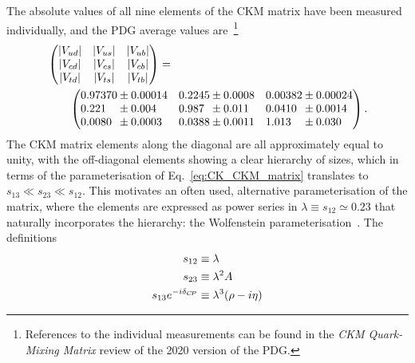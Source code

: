 The absolute values of all nine elements of the CKM matrix have been measured individually, and the PDG average values are~\cite{PDG2020}\footnote{References to the individual measurements can be found in the \emph{CKM Quark-Mixing Matrix} review of the 2020 version of the PDG.}
\begin{align}
    &\begin{pmatrix}
        |V_{ud}| & 
        |V_{us}| & 
        |V_{ub}| \\
        |V_{cd}| & 
        |V_{cs}| & 
        |V_{cb}| \\
        |V_{td}| & 
        |V_{ts}| & 
        |V_{tb}| 
    \end{pmatrix} =\notag\\
    &\qquad\begin{pmatrix}
        0.97370             \pm 0.00014             &  %
        0.2245              \pm 0.0008              &  %
        0.00382             \pm 0.00024             \\ %
        0.221\phantom{00}   \pm 0.004\phantom{00}   &  %
        0.987\phantom{0}    \pm 0.011\phantom{0}    &  %
        0.0410\phantom{0}   \pm 0.0014\phantom{0}   \\ %
        0.0080\phantom{0}   \pm 0.0003\phantom{0}   &  %
        0.0388              \pm 0.0011              &  %
        1.013\phantom{00}   \pm 0.030\phantom{00}  %
    \end{pmatrix}.
\end{align}
The CKM matrix elements along the diagonal are all approximately equal to unity, with the off-diagonal elements showing a clear hierarchy of sizes, which in terms of the parameterisation of Eq.~\eqref{eq:CK_CKM_matrix} translates to $s_{13}\ll s_{23} \ll s_{12}$. This motivates an often used, alternative parameterisation of the matrix, where the elements are expressed as power series in $\lambda\equiv s_{12}\simeq 0.23$ that naturally incorporates the hierarchy: the Wolfenstein parameterisation~\cite{wolfensteinParametrizationKobayashiMaskawaMatrix1983}. The definitions
\begin{align}
    \begin{split}
         s_{12} &\equiv \lambda \\
         s_{23} &\equiv \lambda^2A \\
         s_{13} e^{-i\delta_{C\!P}}&\equiv \lambda^3(\rho - i \eta) \\
    \end{split}
\end{align}
